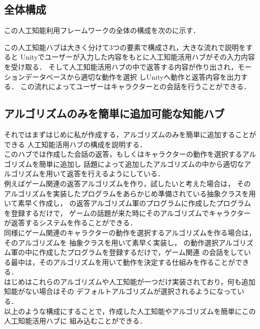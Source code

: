 \subsection{全体構成}
この人工知能利用フレームワークの全体の構成を次のに示す．


この人工知能ハブは大きく分けて3つの要素で構成され，大きな流れで説明をすると
Unityでユーザーが入力した内容をもとに人工知能活用ハブがその入力内容を受け取る．
そして人工知能活用ハブの中で返答する内容が作り出され，モーションデータベースから適切な動作を選択
しUnityへ動作と返答内容を出力する．
この流れによってユーザーはキャラクターとの会話を行うことができる．
\subsection{アルゴリズムのみを簡単に追加可能な知能ハブ}
それではまずはじめに私が作成する，アルゴリズムのみを簡単に追加することができる
人工知能活用ハブの構成を説明する．\\

このハブでは作成した会話の返答，もしくはキャラクターの動作を選択するアルゴリズムを簡単に追加し
話題によって追加したアルゴリズムの中から適切なアルゴリズムを用いて返答を行えるようにしている．\\

例えばゲーム関連の返答アルゴリズムを作り，試したいと考えた場合は，
そのアルゴリズムを実装したプログラムをあらかじめ準備されている抽象クラスを用いて素早く作成し，
の返答アルゴリズム軍のプログラムに作成したプログラムを登録するだけで，
ゲームの話題が来た時にそのアルゴリズムでキャラクターが返答するシステムを作ることができる．\\

同様にゲーム関連のキャラクターの動作を選択するアルゴリズムを作る場合は，そのアルゴリズムを
抽象クラスを用いて素早く実装し，
の動作選択アルゴリズム軍の中に作成したプログラムを登録するだけで，ゲーム関連
の会話をしている最中は，そのアルゴリズムを用いて動作を決定する仕組みを作ることができる．\\

はじめはこれらのアルゴリズムや人工知能が一つだけ実装されており，何も追加知能がない場合はその
デフォルトアルゴリズムが選択されるようになっている．\\

以上のような構成にすることで，作成した人工知能やアルゴリズムを簡単にこの人工知能活用ハブに
組み込むことができる．

